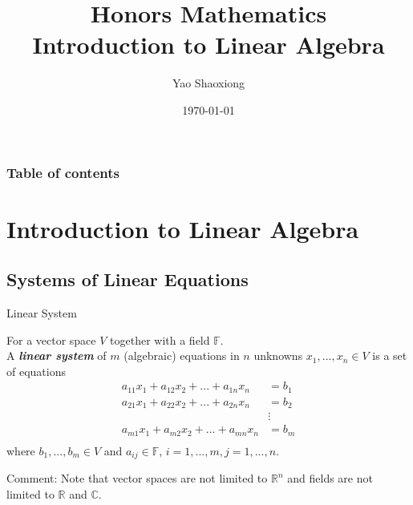 \documentclass[hyperref={pdfpagelabels=true}]{beamer}
\title{Honors Mathematics \\Introduction to Linear Algebra}
\author{Yao Shaoxiong}
\date{\today}
\institute[UM-JI]{UM-SJTU Joint Institute}
\newcommand{\C}{\mathbb{C}} \newcommand{\F}{\mathbb{F}} \newcommand{\R}{\mathbb{R}} \newcommand{\Q}{\mathbb{Q}}
\newcommand{\highlightg}[1]{\textcolor[rgb]{0.1,0.5,0.3}{\emph{\textbf{#1}}}}
\newcommand{\structb}[1]{\textcolor[rgb]{0.2,0.2,0.7}{#1}}
\newcommand{\<}{\langle}
\renewcommand{\>}{\rangle}
\begin{document}
\begin{frame}
\titlepage
\end{frame} 


\begin{frame}
\frametitle{Table of contents}
\tableofcontents
\end{frame} 

\section{Introduction to Linear Algebra}
\subsection{Systems of Linear Equations}
\begin{frame}{Linear System}
    \begin{block}{}
        For a vector space $V$ together with a field $\F$.\\
        A \highlightg{linear system} of $m$ (algebraic) equations in $n$ unknowns $x_1,...,x_n \in V$ is a set of equations
        \begin{equation}
        \begin{aligned}
            a_{11}x_1+a_{12}x_2+...+a_{1n}x_n &= b_1 \\
            a_{21}x_1+a_{22}x_2+...+a_{2n}x_n &= b_2 \\ 
            &\vdots \\
            a_{m1}x_1+a_{m2}x_2+...+a_{mn}x_n &= b_m \\
        \end{aligned}
        \label{(1)}
        \end{equation}
        where $b_{1},...,b_{m} \in V$ and $a_{ij} \in \F$, $i = 1,...,m, j = 1,...,n.$

        

        \structb{Comment:} Note that vector spaces are not limited to $\R^{n}$ and fields are not limited to $\R$ and $\C$.
    \end{block}
\end{frame}
\end{document}
